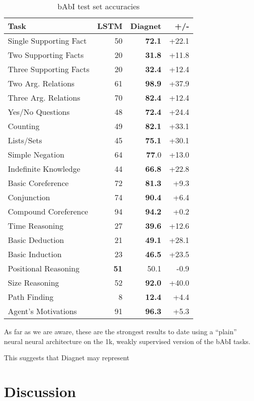 \documentclass{article}
\begin{document}
\begin{table}

\centering
\caption{bAbI test set accuracies}
\begin{tabular}{|l|r|r|r|}
\hline
Task & LSTM & Diagnet & +/- \\
\hline
Single Supporting Fact & 50 & \textbf{72.1} & +22.1 \\
Two Supporting Facts & 20 & \textbf{31.8} & +11.8 \\
Three Supporting Facts & 20 & \textbf{32.4} & +12.4 \\
Two Arg. Relations & 61 & \textbf{98.9} & +37.9 \\
Three Arg. Relations & 70 & \textbf{82.4} & +12.4 \\
Yes/No Questions & 48 & \textbf{72.4} & +24.4 \\
Counting & 49 & \textbf{82.1} & +33.1 \\
Lists/Sets & 45 & \textbf{75.1} & +30.1 \\
Simple Negation & 64 & \textbf{77}.0 & +13.0 \\
Indefinite Knowledge & 44 & \textbf{66.8} & +22.8 \\
Basic Coreference & 72 & \textbf{81.3} & +9.3 \\
Conjunction & 74 & \textbf{90.4} & +6.4 \\
Compound Coreference & 94 & \textbf{94.2} & +0.2 \\
Time Reasoning & 27 & \textbf{39.6} & +12.6 \\
Basic Deduction & 21 & \textbf{49.1} & +28.1 \\
Basic Induction & 23 & \textbf{46.5} & +23.5 \\
Positional Reasoning & \textbf{51} & 50.1 & -0.9 \\
Size Reasoning & 52 & \textbf{92.0} & +40.0 \\
Path Finding & 8 & \textbf{12.4} & +4.4 \\
Agent's Motivations & 91 & \textbf{96.3} & +5.3 \\
\hline

\end{tabular}

\end{table}

As far as we are aware, these are the strongest results to date using a “plain” neural neural architecture on the 1k, weakly supervised version of the bAbI tasks.

This suggests that Diagnet may represent 

\section{Discussion}
\end{document}
